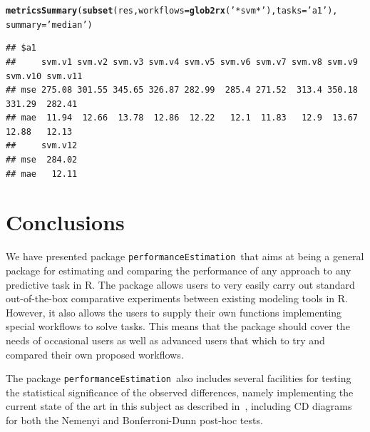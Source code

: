 \documentclass[10pt,a4paper]{article}\usepackage[]{graphicx}\usepackage[]{color}
\makeatletter
\newcommand{\hlstr}[1]{\textcolor[rgb]{0.192,0.494,0.8}{#1}}%
\newcommand{\hlstd}[1]{\textcolor[rgb]{0.345,0.345,0.345}{#1}}%
\newcommand{\hlkwc}[1]{\textcolor[rgb]{0.333,0.667,0.333}{#1}}%
\newcommand{\hlkwd}[1]{\textcolor[rgb]{0.737,0.353,0.396}{\textbf{#1}}}%
\newenvironment{kframe}{%
 \def\at@end@of@kframe{}%
 \ifinner\ifhmode%
  \def\at@end@of@kframe{\end{minipage}}%
  \begin{minipage}{\columnwidth}%
 \fi\fi%
 \def\FrameCommand##1{\hskip\@totalleftmargin \hskip-\fboxsep
 \colorbox{shadecolor}{##1}\hskip-\fboxsep
     \hskip-\linewidth \hskip-\@totalleftmargin \hskip\columnwidth}%
 \MakeFramed {\advance\hsize-\width
   \@totalleftmargin\z@ \linewidth\hsize
   \@setminipage}}%
 {\par\unskip\endMakeFramed%
 \at@end@of@kframe}
\newenvironment{knitrout}{}{} %
\newcommand{\PE}{package \texttt{performanceEstimation}\ }
\makeatother
\begin{document}
\begin{knitrout}\small
{}\color{fgcolor}\begin{kframe}
\begin{alltt}
\hlkwd{metricsSummary}\hlstd{(}\hlkwd{subset}\hlstd{(res,} \hlkwc{workflows}\hlstd{=}\hlkwd{glob2rx}\hlstd{(}\hlstr{'*svm*'}\hlstd{),} \hlkwc{tasks}\hlstd{=}\hlstr{'a1'}\hlstd{),}
               \hlkwc{summary}\hlstd{=}\hlstr{'median'}\hlstd{)}
\end{alltt}
\begin{verbatim}
## $a1
##     svm.v1 svm.v2 svm.v3 svm.v4 svm.v5 svm.v6 svm.v7 svm.v8 svm.v9 svm.v10 svm.v11
## mse 275.08 301.55 345.65 326.87 282.99  285.4 271.52  313.4 350.18  331.29  282.41
## mae  11.94  12.66  13.78  12.86  12.22   12.1  11.83   12.9  13.67   12.88   12.13
##     svm.v12
## mse  284.02
## mae   12.11
\end{verbatim}
\end{kframe}
\end{knitrout}

\section{Conclusions}

We have presented \PE that aims at being a general package for estimating and comparing the performance of any approach to any predictive task in R. The package allows users to very easily carry out standard out-of-the-box comparative experiments between existing modeling tools in R. However, it also allows the users to supply their own functions implementing special workflows to solve tasks. This means that the package should cover the needs of occasional users as well as advanced users that which to try and compared their own proposed workflows.

The \PE also includes several facilities for testing the statistical significance of the observed differences, namely implementing the current state of the art in this subject as described in~\cite{Dem06}, including CD diagrams for both the Nemenyi and Bonferroni-Dunn post-hoc tests.



\end{document}
